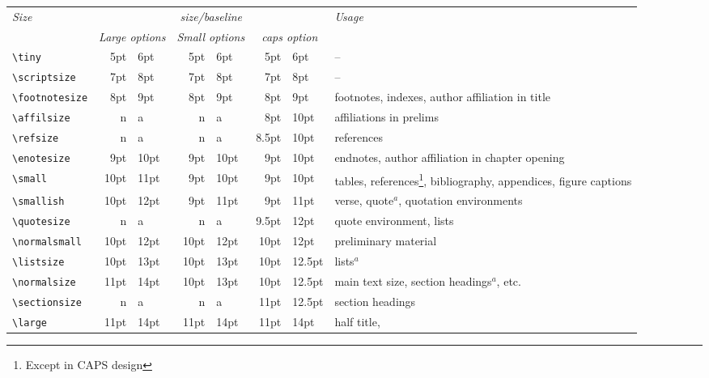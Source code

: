\documentclass[cup6a]{cupbook}
\begin{document}
\begin{table*}[hbt]
\caption{Type sizes for \LaTeX\ size-changing commands.}
\label{tab:fontsizes}
 \begin{tabular}{l|r@{/}lr@{/}lr@{/}lp{4cm}}
 \hline\hline
  \multicolumn{1}{l|}{\it Size}&\multicolumn{6}{c|}{\it size/baseline} & \it Usage\\
& \multicolumn{2}{c}{\it Large options} & \multicolumn{2}{c}{\it Small options} & \multicolumn{2}{c}{\it caps option} & \\
 \hline
 \verb"\tiny"         &  5pt &  6pt &  5pt &  6pt & 5pt & 6pt & -- \\
 \verb"\scriptsize"   &  7pt &  8pt &  7pt &  8pt & 7pt &  8pt & -- \\
 \verb"\footnotesize" &  8pt &  9pt &  8pt &  9pt & 8pt &  9pt & footnotes,
                   indexes, author affiliation in title \\
 \verb"\affilsize"    &  n   &  a   &  n   & a    & 8pt & 10pt &
                   affiliations in prelims\\
 \verb"\refsize"      &  n   &  a   &  n   & a    & 8.5pt & 10pt &
                   references\\
 \verb"\enotesize"    &  9pt & 10pt &  9pt & 10pt & 9pt & 10pt & endnotes,
                   author affiliation in chapter opening \\
 \verb"\small"        & 10pt & 11pt &  9pt & 10pt & 9pt & 10pt & tables,
                   references\footnote{Except in CAPS design}, bibliography,
                   appendices, figure captions\\
 \verb"\smallish"     & 10pt & 12pt &  9pt & 11pt & 9pt & 11pt & verse,
                   quote$^a$, quotation environments\\
 \verb"\quotesize"    &  n   &  a   &  n   & a    & 9.5pt & 12pt &
                   quote environment, lists\\
 \verb"\normalsmall"  & 10pt & 12pt & 10pt & 12pt & 10pt & 12pt & preliminary
                   material\\
 \verb"\listsize"     & 10pt & 13pt & 10pt & 13pt & 10pt & 12.5pt & lists$^a$ \\
 \verb"\normalsize"   & 11pt & 14pt & 10pt & 13pt & 10pt & 12.5pt & main text
                   size, section headings$^a$, etc.\\
 \verb"\sectionsize"  &  n   &  a   &  n   & a    & 11pt & 12.5pt &
                   section headings\\
 \verb"\large"        & 11pt & 14pt & 11pt & 14pt & 11pt & 14pt & half title,

\end{tabular}
\end{table*}
\end{document}
